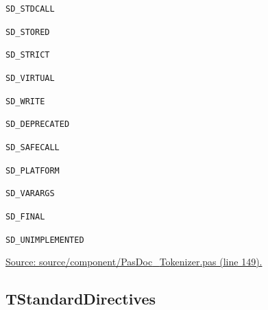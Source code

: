 \documentclass{report}
\newif\ifpdf
\begin{document}
\begin{list}{}
\begin{description}
\item[\texttt{SD{\_}STDCALL}] \label{PasDoc_Tokenizer-SD_STDCALL}
\index{}
 
\item[\texttt{SD{\_}STORED}] \label{PasDoc_Tokenizer-SD_STORED}
\index{}
 
\item[\texttt{SD{\_}STRICT}] \label{PasDoc_Tokenizer-SD_STRICT}
\index{}
 
\item[\texttt{SD{\_}VIRTUAL}] \label{PasDoc_Tokenizer-SD_VIRTUAL}
\index{}
 
\item[\texttt{SD{\_}WRITE}] \label{PasDoc_Tokenizer-SD_WRITE}
\index{}
 
\item[\texttt{SD{\_}DEPRECATED}] \label{PasDoc_Tokenizer-SD_DEPRECATED}
\index{}
 
\item[\texttt{SD{\_}SAFECALL}] \label{PasDoc_Tokenizer-SD_SAFECALL}
\index{}
 
\item[\texttt{SD{\_}PLATFORM}] \label{PasDoc_Tokenizer-SD_PLATFORM}
\index{}
 
\item[\texttt{SD{\_}VARARGS}] \label{PasDoc_Tokenizer-SD_VARARGS}
\index{}
 
\item[\texttt{SD{\_}FINAL}] \label{PasDoc_Tokenizer-SD_FINAL}
\index{}
 
\item[\texttt{SD{\_}UNIMPLEMENTED}] \label{PasDoc_Tokenizer-SD_UNIMPLEMENTED}
\index{}
 
\end{description}
\par
\href{https://github.com/pasdoc/pasdoc/blob/master/source/component/PasDoc_Tokenizer.pas#L149}{Source: source/component/PasDoc{\_}Tokenizer.pas (line 149).}

\end{list}
\ifpdf
\subsection*{\large{\textbf{TStandardDirectives}}\normalsize\hspace{1ex}\hrulefill}
\else
\end{document}
